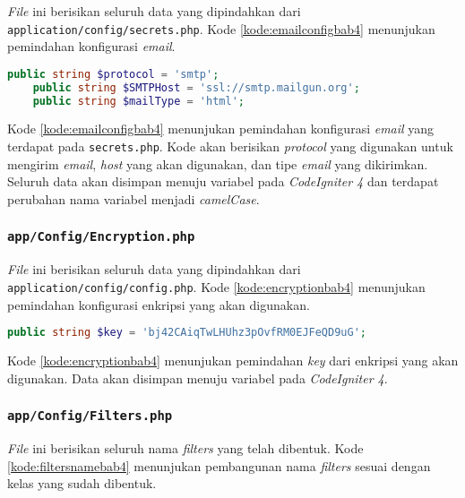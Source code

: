 \textit{File} ini berisikan seluruh data yang dipindahkan dari \texttt{application/config/secrets.php}. Kode \ref{kode:emailconfigbab4} menunjukan pemindahan konfigurasi \textit{email}.

\begin{lstlisting}[language=PHP, caption=Pemindahan \texttt{app/config/secrets.php} menuju \texttt{Email.php}, label=kode:emailconfigbab4]
    public string $protocol = 'smtp';
    public string $SMTPHost = 'ssl://smtp.mailgun.org';
    public string $mailType = 'html';
\end{lstlisting}

Kode \ref{kode:emailconfigbab4} menunjukan pemindahan konfigurasi \textit{email} yang terdapat pada \texttt{secrets.php}. Kode akan berisikan \textit{protocol} yang digunakan untuk mengirim \textit{email}, \textit{host} yang akan digunakan, dan tipe \textit{email} yang dikirimkan. Seluruh data akan disimpan menuju variabel pada \textit{CodeIgniter 4} dan terdapat perubahan nama variabel menjadi \textit{camelCase}.

\subsubsection{\texttt{app/Config/Encryption.php}}
\textit{File} ini berisikan seluruh data yang dipindahkan dari \texttt{application/config/config.php}. Kode \ref{kode:encryptionbab4} menunjukan pemindahan konfigurasi enkripsi yang akan digunakan.

\begin{lstlisting}[language=PHP, caption=Pemindahan \texttt{app/config/config.php} menuju \texttt{Encryption.php}, label=kode:encryptionbab4]
    public string $key = 'bj42CAiqTwLHUhz3pOvfRM0EJFeQD9uG';
\end{lstlisting}

Kode \ref{kode:encryptionbab4} menunjukan pemindahan \textit{key} dari enkripsi yang akan digunakan. Data akan disimpan menuju variabel pada \textit{CodeIgniter 4}.

\subsubsection{\texttt{app/Config/Filters.php}}
\label{subsubsec:filters}
\textit{File} ini berisikan seluruh nama \textit{filters} yang telah dibentuk. Kode \ref{kode:filtersnamebab4} menunjukan pembangunan nama \textit{filters} sesuai dengan kelas yang sudah dibentuk.


